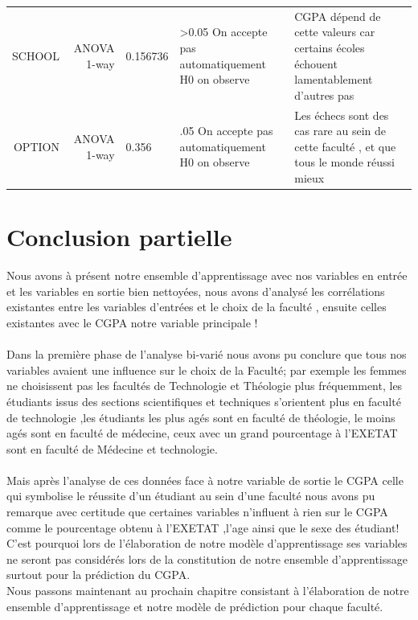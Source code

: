 \begin{table}
{{\begin{tabularx}{\textwidth}{RRHJW}
					SCHOOL & ANOVA 1-way &0.156736& >0.05 On accepte pas automatiquement H0 on observe  & CGPA dépend de cette valeurs car certains écoles échouent lamentablement d'autres pas\\
					 
					OPTION &ANOVA 1-way &0.356&  .05 On accepte pas automatiquement H0 on observe& Les échecs sont des cas rare au sein de cette faculté , et que tous le monde réussi mieux \\
					 
					\bottomrule
		\end{tabularx}}}
		\endgroup
	\end{table}
\newpage 
\section{Conclusion partielle}
Nous avons à présent notre ensemble d'apprentissage avec nos variables en entrée et les variables en sortie bien nettoyées, nous avons d'analysé 
les corrélations existantes entre les variables d'entrées et le choix de la faculté , ensuite celles existantes avec le CGPA notre variable principale !
\paragraph{}
Dans la première phase de l'analyse bi-varié nous avons pu conclure que tous nos variables avaient une influence  sur le choix de la Faculté;
par exemple les femmes ne choisissent pas les facultés de Technologie et Théologie plus fréquemment, les étudiants issus des sections scientifiques et techniques s'orientent plus en faculté de technologie ,les étudiants les plus agés sont en faculté de théologie, le moins agés sont en faculté de médecine, ceux avec un grand pourcentage à l'\ac{EXETAT} sont en faculté de Médecine et technologie.
\paragraph{}
Mais après l'analyse de ces données face à notre variable de sortie le CGPA celle qui symbolise le réussite d'un étudiant au sein d'une faculté nous avons pu remarque avec certitude que certaines variables n'influent à rien sur le CGPA comme le pourcentage obtenu à l'\ac{EXETAT}  ,l'age ainsi que le sexe des étudiant!
C'est pourquoi lors de l'élaboration de  notre modèle d'apprentissage ses variables ne seront pas considérés lors de la constitution de notre ensemble d'apprentissage surtout pour la prédiction du CGPA. \\
Nous passons maintenant au prochain chapitre consistant à l'élaboration de notre ensemble d'apprentissage et notre modèle de prédiction  pour chaque faculté.